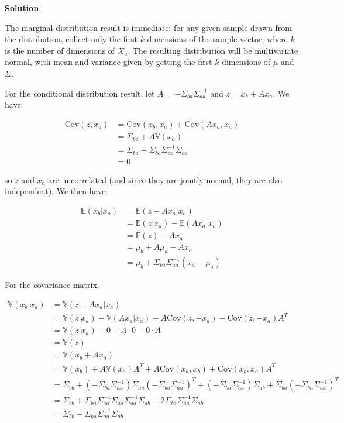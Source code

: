 \textbf{Solution}.

The marginal distribution result is immediate: for any given sample
drawn from the distribution, collect only the first \(k\) dimensions of
the sample vector, where \(k\) is the number of dimensions of \(X_a\).
The resulting distribution will be multivariate normal, with mean and
variance given by getting the first \(k\) dimensions of \(\mu\) and
\(\Sigma\).

For the conditional distribution result, let
\(A = -\Sigma_{ba} \Sigma_{aa}^{-1}\) and \(z = x_b + A x_a\). We have:

\begin{align*}
\text{Cov}(z, x_a) &= \text{Cov}(x_b, x_a) + \text{Cov}(A x_a, x_a) \\
&= \Sigma_{ba} + A \mathbb{V}(x_a) \\
&= \Sigma_{ba} - \Sigma_{ba} \Sigma_{aa}^{-1} \Sigma_{aa} \\
&= 0
\end{align*}

so \(z\) and \(x_a\) are uncorrelated (and since they are jointly
normal, they are also independent). We then have:

\begin{align*}
\mathbb{E}(x_b | x_a) &= \mathbb{E}(z - A x_a | x_a) \\
&= \mathbb{E}(z | x_a) - \mathbb{E}(A x_a | x_a) \\
&= \mathbb{E}(z) - A x_a \\
&= \mu_b + A \mu_a - A x_a \\
&= \mu_b + \Sigma_{ba} \Sigma_{aa}^{-1} (x_a - \mu_a)
\end{align*}

For the covariance matrix,

\begin{align*}
\mathbb{V}(x_b | x_a) &= \mathbb{V}(z - A x_a | x_a) \\
&= \mathbb{V}(z | x_a) - \mathbb{V}(A x_a | x_a) - A \text{Cov}(z, -x_a) - \text{Cov}(z, -x_a) A^T \\
&= \mathbb{V}(z | x_a) - 0 - A \cdot 0 - 0 \cdot A \\
&= \mathbb{V}(z) \\
&= \mathbb{V}(x_b + A x_a) \\
&= \mathbb{V}(x_b) + A \mathbb{V}(x_a) A^T + A \text{Cov}(x_a, x_b) + \text{Cov}(x_b, x_a) A^T \\
&= \Sigma_{bb} + (- \Sigma_{ba} \Sigma_{aa}^{-1}) \Sigma_{aa} (- \Sigma_{ba} \Sigma_{aa}^{-1})^T + (- \Sigma_{ba} \Sigma_{aa}^{-1}) \Sigma_{ab} + \Sigma_{ba} (- \Sigma_{ba} \Sigma_{aa}^{-1})^T \\
&= \Sigma_{bb} + \Sigma_{ba} \Sigma_{aa}^{-1} \Sigma_{aa} \Sigma_{aa}^{-1} \Sigma_{ab} - 2 \Sigma_{ba}\Sigma_{aa}^{-1}\Sigma_{ab} \\
&= \Sigma_{bb} - \Sigma_{ba}\Sigma_{aa}^{-1}\Sigma_{ab}
\end{align*}

